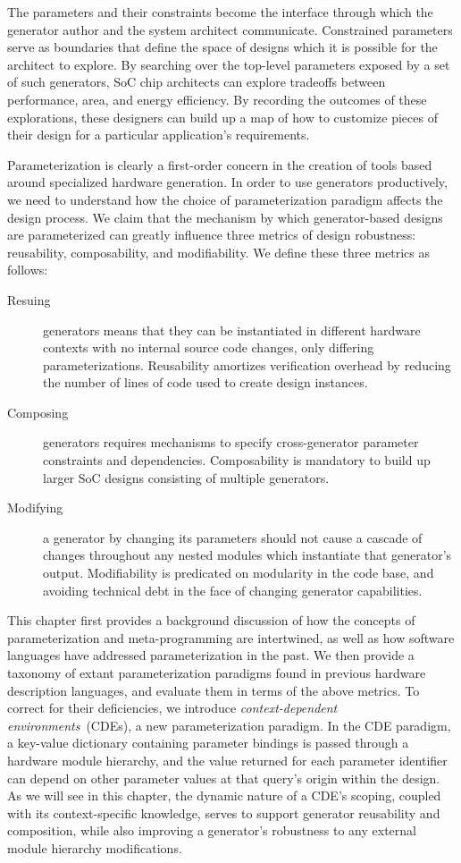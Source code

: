 The parameters and their constraints become the interface through which the generator author and the system architect communicate.
Constrained parameters serve as boundaries that define the space of designs which it is possible for the architect to explore.
By searching over the top-level parameters exposed by a set of such generators, SoC chip architects can explore tradeoffs between performance, area, and energy efficiency.
By recording the outcomes of these explorations, these designers can build up a map of how to customize pieces of their design for a particular application's requirements.

Parameterization is clearly a first-order concern in the creation of tools based around specialized hardware generation.
In order to use generators productively, we need to understand how the choice of parameterization paradigm affects the design process.
We claim that the mechanism by which generator-based designs are parameterized can greatly influence three metrics of design robustness: reusability, composability, and modifiability.
We define these three metrics as follows:
\begin{description}
\item[Resuing] generators means that they can be instantiated in different hardware contexts with no internal source code changes, only differing parameterizations. Reusability amortizes verification overhead by reducing the number of lines of code used to create design instances.
\item[Composing] generators requires mechanisms to specify cross-generator parameter constraints and dependencies. Composability is mandatory to build up larger SoC designs consisting of multiple generators.
\item[Modifying] a generator by changing its parameters should not cause a cascade of changes throughout any nested modules which instantiate that generator's output. Modifiability is predicated on modularity in the code base, and avoiding technical debt in the face of changing generator capabilities.
\end{description}

This chapter first provides a background discussion of how the concepts of parameterization and meta-programming are intertwined, as well as how software languages have addressed parameterization in the past.
We then provide a taxonomy of extant parameterization paradigms found in previous hardware description languages, and evaluate them in terms of the above metrics.
To correct for their deficiencies, we introduce \emph{context-dependent environments}~(CDEs), a new parameterization paradigm.
In the CDE paradigm, a key-value dictionary containing parameter bindings is passed through a hardware module hierarchy, and the value returned for each parameter identifier can depend on other parameter values at that query's origin within the design.
As we will see in this chapter,
the dynamic nature of a CDE's scoping, coupled with its context-specific knowledge, 
serves to support generator reusability and composition, while also improving a generator's robustness to any external module hierarchy modifications.

